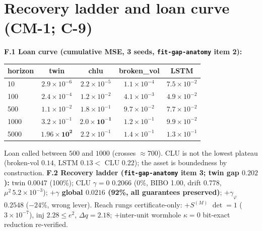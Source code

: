 \documentclass[11pt]{article}
\begin{document}
\section{Recovery ladder and loan curve (CM-1; C-9)}
\textbf{F.1 Loan curve (cumulative MSE, 3 seeds, \texttt{fit-gap-anatomy} item 2):}
\begin{center}\small
\begin{tabular}{lcccc}
\toprule
horizon & twin & chlu & broken\_vol & LSTM \\
\midrule
10 & $2.9\times10^{-6}$ & $2.2\times10^{-5}$ & $1.1\times10^{-4}$ & $7.5\times10^{-2}$ \\
100 & $2.4\times10^{-4}$ & $1.2\times10^{-2}$ & $4.1\times10^{-3}$ & $4.9\times10^{-2}$ \\
500 & $1.1\times10^{-2}$ & $1.8\times10^{-1}$ & $9.7\times10^{-2}$ & $7.7\times10^{-2}$ \\
1000 & $3.2\times10^{-1}$ & $\mathbf{2.0\times10^{-1}}$ & $1.2\times10^{-1}$ & $9.9\times10^{-2}$ \\
5000 & $\mathbf{1.96\times10^{2}}$ & $2.2\times10^{-1}$ & $1.4\times10^{-1}$ & $1.3\times10^{-1}$ \\
\bottomrule
\end{tabular}
\end{center}
Loan called between $500$ and $1000$ (crosses $\approx700$). CLU is not the lowest plateau (broken-vol $0.14$, LSTM $0.13 < $ CLU $0.22$); the asset is boundedness by construction. \textbf{F.2 Recovery ladder (\texttt{fit-gap-anatomy} item 3; twin gap $0.202$):} twin $0.0047$ (100\%); CLU $\gamma{=}0$ $0.2066$ (0\%, BIBO 1.00, drift 0.778, $\mu^2\,5.2\times10^{-3}$); \textbf{$+\gamma$ global $0.0216$ (92\%, all guarantees preserved)}; $+\gamma_\varphi$ $0.2548$ ($-24\%$, wrong lever). Reach rungs certificate-only: $+S^{(M)}$ $\det=1$ ($3\times10^{-7}$), inj $2.28\le e^2$, $\Delta q=2.18$; $+$inter-unit wormhole $\kappa{=}0$ bit-exact reduction re-verified.
\end{document}
